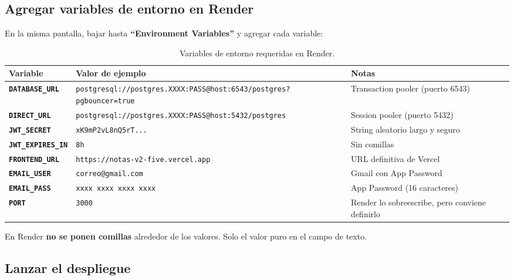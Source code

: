 \documentclass[12pt, a4paper]{article}
\newcommand{\cmd}[1]{\texttt{#1}}
\newcommand{\var}[1]{\texttt{\textbf{#1}}}
\begin{document}
\subsection{Agregar variables de entorno en Render}

En la misma pantalla, bajar hasta \textbf{``Environment Variables''} y agregar cada variable:

\begin{table}[H]
    \centering
    \begin{tabular}{p{4cm} p{5cm} p{4cm}}
        \toprule
        \textbf{Variable} & \textbf{Valor de ejemplo} & \textbf{Notas} \\
        \midrule
        \var{DATABASE\_URL}  & \tiny\cmd{postgresql://postgres.XXXX:PASS@host:6543/postgres?pgbouncer=true} & Transaction pooler (puerto 6543) \\[0.2cm]
        \var{DIRECT\_URL}    & \tiny\cmd{postgresql://postgres.XXXX:PASS@host:5432/postgres} & Session pooler (puerto 5432) \\[0.2cm]
        \var{JWT\_SECRET}    & \cmd{xK9mP2vL8nQ5rT...} & String aleatorio largo y seguro \\[0.2cm]
        \var{JWT\_EXPIRES\_IN} & \cmd{8h} & Sin comillas \\[0.2cm]
        \var{FRONTEND\_URL}  & \cmd{https://notas-v2-five.vercel.app} & URL definitiva de Vercel \\[0.2cm]
        \var{EMAIL\_USER}    & \cmd{correo@gmail.com} & Gmail con App Password \\[0.2cm]
        \var{EMAIL\_PASS}    & \cmd{xxxx xxxx xxxx xxxx} & App Password (16 caracteres) \\[0.2cm]
        \var{PORT}           & \cmd{3000} & Render lo sobreescribe, pero conviene definirlo \\
        \bottomrule
    \end{tabular}
    \caption{Variables de entorno requeridas en Render.}
\end{table}

\begin{nota}
    En Render \textbf{no se ponen comillas} alrededor de los valores. Solo el valor puro en el campo de texto.
\end{nota}

\subsection{Lanzar el despliegue}
\end{document}
